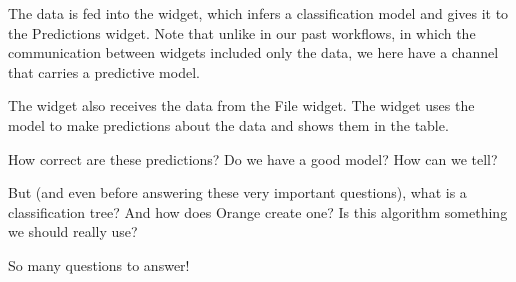The data is fed into the  widget, which infers a classification model and gives it to the Predictions widget. Note that unlike in our past workflows, in which the communication between widgets included only the data, we here have a channel that carries a predictive model.

The  widget also receives the data from the File widget. The widget uses the model to make predictions about the data and shows them in the table.

How correct are these predictions? Do we have a good model? How can we tell?

But (and even before answering these very important questions), what is a classification tree? And how does Orange create one? Is this algorithm something we should really use?

So many questions to answer!
